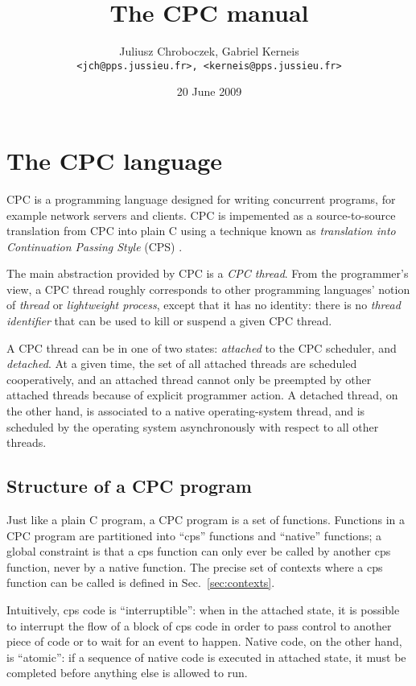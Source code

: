\documentclass[a4paper]{report}
\title{The CPC manual}
\author{Juliusz Chroboczek, Gabriel Kerneis\\
{\tt <jch@pps.jussieu.fr>, <kerneis@pps.jussieu.fr>}}
\date{20 June 2009}
\begin{document}
\maketitle

\chapter{The CPC language} \label{chapter:language}

CPC is a programming language designed for writing concurrent programs, for
example network servers and clients.  CPC is impemented as a
source-to-source translation from CPC into plain C using a technique known
as {\em translation into Continuation Passing Style\/} (CPS)
\cite{strachey:continuations, plotkin:call-by-lambda}.

The main abstraction provided by CPC is a {\em CPC thread}.  From the
programmer's view, a CPC thread roughly corresponds to other programming
languages' notion of {\em thread\/} or {\em lightweight process}, except
that it has no identity: there is no {\em thread identifier\/} that can be
used to kill or suspend a given CPC thread.

A CPC thread can be in one of two states: {\em attached\/} to the CPC
scheduler, and {\em detached}.  At a given time, the set of all attached
threads are scheduled cooperatively, and an attached thread cannot only be
preempted by other attached threads because of explicit programmer action.
A detached thread, on the other hand, is associated to a native
operating-system thread, and is scheduled by the operating system
asynchronously with respect to all other threads.

\section{Structure of a CPC program}

Just like a plain C program, a CPC program is a set of functions.
Functions in a CPC program are partitioned into ``cps'' functions and
``native'' functions; a global constraint is that a cps function can
only ever be called by another cps function, never by a native
function.  The precise set of contexts where a cps function can be
called is defined in Sec.~\ref{sec:contexts}.

Intuitively, cps code is ``interruptible'': when in the attached state, it
is possible to interrupt the flow of a block of cps code in order to pass
control to another piece of code or to wait for an event to happen.  Native
code, on the other hand, is ``atomic'': if a sequence of native code is
executed in attached state, it must be completed before anything else is
allowed to run.
\end{document}
